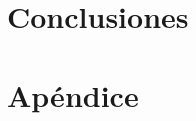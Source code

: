 \documentclass[12pt,a4paper,spanish]{book}
\begin{document}
\chapter{Conclusiones}



\cleardoublepage
{}

%






\appendix
\cleardoublepage
\addappheadtotoc
\appendixpage

\chapter{Apéndice}

%
%


\end{document}
